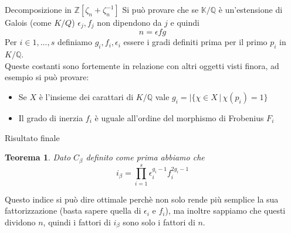 \documentclass{beamer}
\theoremstyle{plain}
\newtheorem{teo}{Teorema}[section]
\theoremstyle{remark}
\theoremstyle{definition}
\newcommand{\Z}{\mathbb{Z}}
\newcommand{\K}{\mathbb{K}}
\newcommand{\Q}{\mathbb{Q}}
\begin{document}
	\begin{frame}{Decomposizione in $ \Z [\zeta_n + \zeta_n^{-1}] $}
		Si può provare che se $ \K / \Q $ è un'estensione di Galois (come $ K / Q $) $ \epsilon _j, f_j $ non dipendono da $ j $ e quindi \[ n = \epsilon fg \] \pause
		Per $ i\in {1 , ... , s} $ definiamo $ g_i , f_i , \epsilon _i $ essere i gradi definiti prima per il primo $ p_i$ in $ K /\Q $.\\
		\pause
		Queste costanti sono fortemente in relazione con altri oggetti visti finora, ad esempio si può provare:
		\begin{itemize}
		\item Se $ X $ è l'insieme dei carattari di $ K / \Q $ vale $ g_i = | \{ \chi \in X \,|\, \chi(p_i)=1 \} $
		\item Il grado di inerzia $ f_i $ è uguale all'ordine del morphismo di Frobenius $ F_i $
		\end{itemize}
	\end{frame}
	
	\begin{frame}{Risultato finale}
		\begin{teo} \label{teo:idx_opt}
					Dato $ C_\beta $ definito come prima abbiamo che
					\[ i_\beta  =  \prod_{i=1}^s \epsilon _i^{g_i - 1} f_i ^{2 g_i - 1}\]
		\end{teo}
		\pause
		Questo indice si può dire ottimale perchè non solo rende più semplice la sua fattorizzazione (basta sapere quella di $ \epsilon _i $ e $ f_i $), ma inoltre sappiamo che questi dividono $ n $, quindi i fattori di $i_\beta $ sono solo i fattori di $ n $.
	\end{frame}

	
	

	
	
	
	
	
\end{document}
